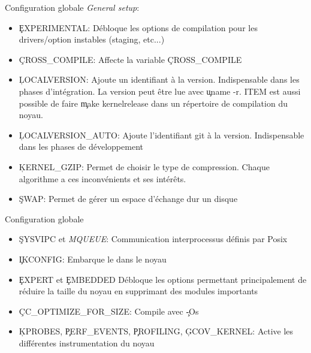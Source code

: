 \begin{frame}[fragile=singleslide]{Configuration globale}
  \emph{General setup}:
  \begin{itemize} 
  \item  \c{EXPERIMENTAL}: Débloque les  options de  compilation pour
    les drivers/option instables (staging, etc...)
  \item \c{CROSS_COMPILE}: Affecte la variable \c{CROSS_COMPILE}
  \item    \c{LOCALVERSION}:    Ajoute    un   identifiant    à    la
    version. Indispensable dans les phases d'intégration. La version
    peut  être lue  avec \c{uname  -r}. ITEM  est aussi  possible de
    faire \c{make  kernelrelease} dans un  répertoire de compilation
    du noyau.
  \item  \c{LOCALVERSION_AUTO}:   Ajoute  l'identifiant  git   à  la
    version. Indispensable dans les phases de développement
  \item   \c{KERNEL_GZIP}:   Permet    de   choisir   le   type   de
    compression.  Chaque  algorithme  a  ces  inconvénients  et  ses
    intérêts. 
  \item \c{SWAP}: Permet de gérer un espace d'échange dur un disque
  \end{itemize}
\end{frame}

\begin{frame}[fragile=singleslide]{Configuration globale}
  \begin{itemize} 
  \item   \c{SYSVIPC} et  \emph{MQUEUE}:   Communication  interprocessus
    définis par Posix
  \item \c{IKCONFIG}: Embarque le  dans le noyau 
  \item \c{EXPERT}  et \c{EMBEDDED} Débloque  les options permettant
    principalement de  réduire la taille du noyau  en supprimant des
    modules importants
  \item \c{CC_OPTIMIZE_FOR_SIZE}: Compile avec \c{-Os}
  \item \c{KPROBES}, \c{PERF_EVENTS}, \c{PROFILING}, \c{GCOV_KERNEL}:
    Active les différentes instrumentation du noyau
  \end{itemize} 
\end{frame}

